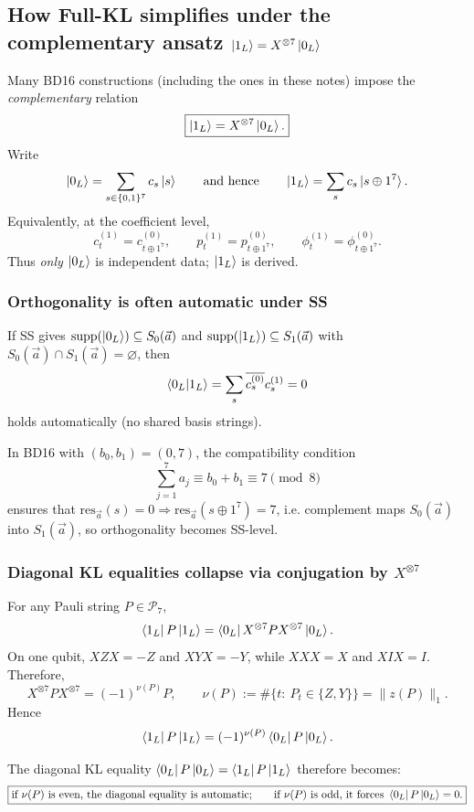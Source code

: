\documentclass[11pt]{article}
\begin{document}
\subsection{How Full-KL simplifies under the complementary ansatz \texorpdfstring{$\ket{1_L}=X^{\otimes 7}\ket{0_L}$}{|1L>=X^7|0L>}}

Many BD16 constructions (including the ones in these notes) impose the \emph{complementary} relation
\[
\boxed{\ket{1_L} = X^{\otimes 7}\ket{0_L}.}
\]
Write
\[
\ket{0_L}=\sum_{s\in\{0,1\}^7} c_s\ket{s}
\qquad\text{and hence}\qquad
\ket{1_L}=\sum_{s} c_s\ket{s\oplus 1^7}.
\]
Equivalently, at the coefficient level,
\[
c^{(1)}_t = c^{(0)}_{t\oplus 1^7},
\qquad
p^{(1)}_t = p^{(0)}_{t\oplus 1^7},
\qquad
\phi^{(1)}_t=\phi^{(0)}_{t\oplus 1^7}.
\]
Thus \emph{only} \(\ket{0_L}\) is independent data; \(\ket{1_L}\) is derived.

\subsubsection{Orthogonality is often automatic under SS}

If SS gives \(\mathrm{supp}(\ket{0_L})\subseteq S_0(\vec a)\) and \(\mathrm{supp}(\ket{1_L})\subseteq S_1(\vec a)\)
with \(S_0(\vec a)\cap S_1(\vec a)=\varnothing\), then
\[
\braket{0_L|1_L}=\sum_{s}\overline{c^{(0)}_s}c^{(1)}_s=0
\]
holds automatically (no shared basis strings).

In BD16 with \((b_0,b_1)=(0,7)\), the compatibility condition
\[
\sum_{j=1}^7 a_j \equiv b_0+b_1 \equiv 7 \pmod 8
\]
ensures that \(\mathrm{res}_{\vec a}(s)=0\Rightarrow \mathrm{res}_{\vec a}(s\oplus 1^7)=7\),
i.e. complement maps \(S_0(\vec a)\) into \(S_1(\vec a)\), so orthogonality becomes SS-level.

\subsubsection{Diagonal KL equalities collapse via conjugation by \texorpdfstring{$X^{\otimes 7}$}{X^7}}

For any Pauli string \(P\in\mathcal{P}_7\),
\[
\bra{1_L}P\ket{1_L}
=
\bra{0_L}X^{\otimes 7} P X^{\otimes 7}\ket{0_L}.
\]
On one qubit, \(XZX=-Z\) and \(XYX=-Y\), while \(XXX=X\) and \(XIX=I\). Therefore,
\[
X^{\otimes 7} P X^{\otimes 7} = (-1)^{\nu(P)} P,
\qquad
\nu(P):=\#\{t:\ P_t\in\{Z,Y\}\}=\|z(P)\|_1.
\]
Hence
\[
\bra{1_L}P\ket{1_L}=(-1)^{\nu(P)}\bra{0_L}P\ket{0_L}.
\]

The diagonal KL equality \(\bra{0_L}P\ket{0_L}=\bra{1_L}P\ket{1_L}\) therefore becomes:
\[
\boxed{
\text{if }\nu(P)\text{ is even, the diagonal equality is automatic;}
\qquad
\text{if }\nu(P)\text{ is odd, it forces }\bra{0_L}P\ket{0_L}=0.
}
\]
\end{document}
